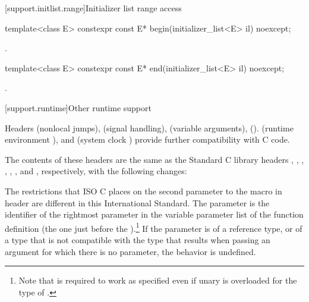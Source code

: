 [support.initlist.range]{Initializer list range access}

\begin{itemdecl}
template<class E> constexpr const E* begin(initializer_list<E> il) noexcept;
\end{itemdecl}

\begin{itemdescr}
\pnum
\returns {}.
\end{itemdescr}

\begin{itemdecl}
template<class E> constexpr const E* end(initializer_list<E> il) noexcept;
\end{itemdecl}

\begin{itemdescr}
\pnum
\returns {}.
\end{itemdescr}

[support.runtime]{Other runtime support}

\pnum
{}%
%
%
%
%
%
%
%
%
%
%
Headers
 (nonlocal jumps),
 (signal handling),
 (variable arguments),
 ().
 (runtime environment ),
and
 (system clock )
provide further compatibility with C code.

\pnum
{}%
%
%
%
%
The contents of these headers are the same as the Standard C library headers
,
,
,
,
,
,
and
,
respectively, with the following changes:

\pnum
The restrictions that ISO C places on the second parameter to the
%
macro in header
%
are different in this International Standard.
The parameter
is the identifier of the rightmost parameter in the variable parameter list
of the function definition (the one just before the
).\footnote{Note that
is required to work as specified even if unary
is overloaded for the type of
.}
If the parameter
is of a reference type, or of a type that is not compatible with the
type that results when passing an argument for which there is no
parameter, the behavior is undefined.

